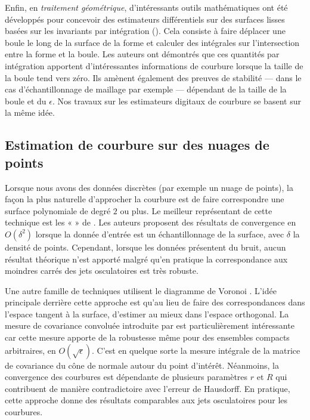 Enfin, en \emph{traitement géométrique}, d'intéressants outils
mathématiques ont été développés pour concevoir des estimateurs différentiels
sur des surfaces lisses basées sur les invariants par intégration
(). Cela consiste à faire déplacer
une boule le long de la surface de la forme et calculer des intégrales sur
l'intersection entre la forme et la boule. Les auteurs ont démontrés que ces
quantités par intégration apportent d'intéressantes informations de courbure
lorsque la taille de la boule tend vers zéro. Ils amènent également des preuves
de stabilité --- dans le cas d'échantillonnage de maillage par exemple ---
dépendant de la taille de la boule et du $\epsilon$. Nos travaux sur les
estimateurs digitaux de courbure se basent sur la même idée.

\subsection{Estimation de courbure sur des nuages de points}

Lorsque nous avons des données discrètes (par exemple un nuage de points), la
façon la plus naturelle d'approcher la courbure est de faire correspondre une
surface polynomiale de degré $2$ ou plus. Le meilleur représentant de cette
technique est les «  » de
. Les auteurs proposent des résultats de
convergence en $O(\delta^2)$ lorsque la donnée d'entrée est un échantillonnage de
la surface, avec $\delta$ la densité de points. Cependant, lorsque les données
présentent du bruit, aucun résultat théorique n'est apporté malgré qu'en
pratique la correspondance aux moindres carrés des jets osculatoires est très
robuste.

Une autre famille de techniques utilisent le diagramme de Voronoi
\cite{Alliez2007,Merigot2009,Merigot2011}. L'idée principale derrière cette
approche est qu'au lieu de faire des correspondances dans l'espace tangent à la
surface, d'estimer au mieux dans l'espace orthogonal. La mesure de covariance
convoluée introduite par  est particulièrement
intéressante car cette mesure apporte de la robustesse même pour des ensembles
compacts arbitraires, en $O(\sqrt{\epsilon})$. C'est en quelque sorte la mesure
intégrale de la matrice de covariance du cône de normale autour du point
d'intérêt. Néanmoins, la convergence des courbures est dépendante de plusieurs
paramètres $r$ et $R$ qui contribuent de manière contradictoire avec l'erreur de
Hausdorff. En pratique, cette approche donne des résultats comparables aux jets
osculatoires pour les courbures.

